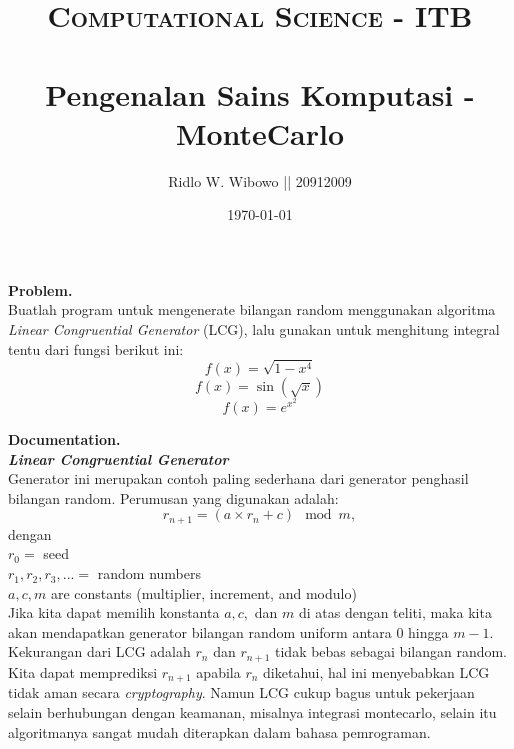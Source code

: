 \documentclass[paper=a4, fontsize=11pt]{scrartcl}
\title{	
\normalfont \normalsize 
\textsc{Computational Science - ITB} \\ [25pt] %
\horrule{0.5pt} \\[0.4cm] %
\small  Pengenalan Sains Komputasi - MonteCarlo\\ %
}
\author{\small{Ridlo W. Wibowo || 20912009}} %
\date{\normalsize\today} %
\numberwithin{equation}{section} %
\numberwithin{figure}{section} %
\numberwithin{table}{section} %
\begin{document}
\maketitle %

\large \textbf{Problem.}\\
Buatlah program untuk mengenerate bilangan random menggunakan algoritma \textit{Linear Congruential Generator} (LCG), lalu gunakan untuk menghitung integral tentu dari fungsi berikut ini:\\
\begin{equation*}
f(x) = \sqrt{1-x^{4}}
\end{equation*}
\begin{equation*}
f(x) = \sin(\sqrt x)
\end{equation*}
\begin{equation*}
f(x) = e^{x^{2}}
\end{equation*}

\vspace{2cm}
\large \textbf{Documentation.}\\
\textit{\textbf{Linear Congruential Generator}}\\
Generator ini merupakan contoh paling sederhana dari generator penghasil bilangan random. Perumusan yang digunakan adalah:
\begin{equation*}
r_{n+1} = (a \times r_{n} + c)\mod m,
\end{equation*} 
dengan\\
$r_{0} = $ seed\\
$r_{1}, r_{2}, r_{3}, ... = $ random numbers\\
$a, c, m$ are constants (multiplier, increment, and modulo)\\
Jika kita dapat memilih konstanta $a, c,$ dan $m$ di atas dengan teliti, maka kita akan mendapatkan generator bilangan random uniform antara $0$ hingga $m-1$.\\

Kekurangan dari LCG adalah $r_{n}$ dan $r_{n+1}$ tidak bebas sebagai bilangan random. Kita dapat memprediksi $r_{n+1}$ apabila $r_{n}$ diketahui, hal ini menyebabkan LCG tidak aman secara \textit{cryptography}. Namun LCG cukup bagus untuk pekerjaan selain berhubungan dengan keamanan, misalnya integrasi montecarlo, selain itu algoritmanya sangat mudah diterapkan dalam bahasa pemrograman.\\
\end{document}
